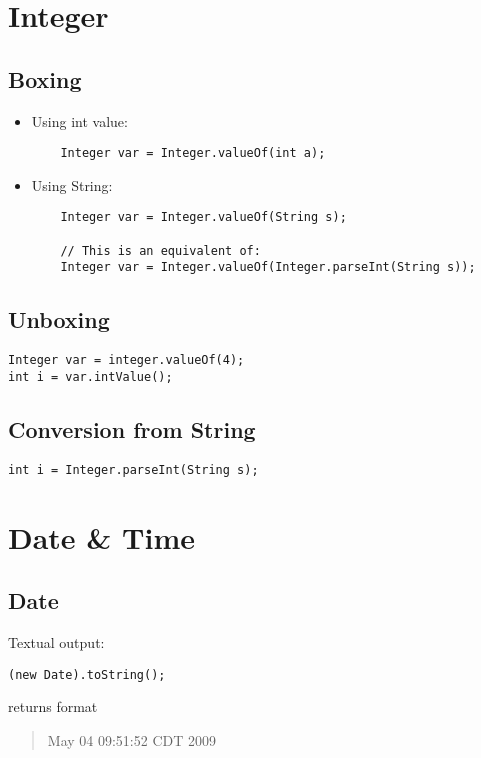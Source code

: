\documentclass{report}
\begin{document}
\chapter{Integer}
\section{Boxing}
\begin{itemize}
	\item Using int value:
	\begin{verbatim}
	Integer var = Integer.valueOf(int a);
	\end{verbatim}
	
	\item Using String:
	\begin{verbatim}
	Integer var = Integer.valueOf(String s);
	
	// This is an equivalent of:
	Integer var = Integer.valueOf(Integer.parseInt(String s));
	\end{verbatim}
\end{itemize}

\section{Unboxing}
\begin{verbatim}
Integer var = integer.valueOf(4);
int i = var.intValue();
\end{verbatim}

\section{Conversion from String}
\begin{verbatim}
int i = Integer.parseInt(String s);
\end{verbatim}

\chapter{Date \& Time}
\section{Date}
Textual output:
\begin{verbatim}
(new Date).toString();
\end{verbatim}

returns format
\begin{quote}
	May 04 09:51:52 CDT 2009
\end{quote}
\end{document}
